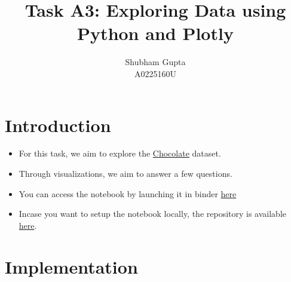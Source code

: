 \documentclass[a4paper]{article}
\title{Task A3: Exploring Data using Python and Plotly}
\author{Shubham Gupta \\ A0225160U}
\begin{document}
\maketitle
\section{Introduction}
\begin{itemize}
    \item For this task, we aim to explore the \href{https://github.com/rfordatascience/tidytuesday/tree/master/data/2022/2022-01-18}{Chocolate} dataset. 
    \item Through visualizations, we aim to answer a few questions.
    \item You can access the notebook by launching it in binder \href{https://mybinder.org/v2/gh/goodhamgupta/cs5346_task_A3/HEAD?labpath=A0225160U_A3.ipynb}{here}
    \item Incase you want to setup the notebook locally, the repository is available \href{https://github.com/goodhamgupta/cs5346_task_A3}{here}. 
\end{itemize}

\section{Implementation}
\end{document}
